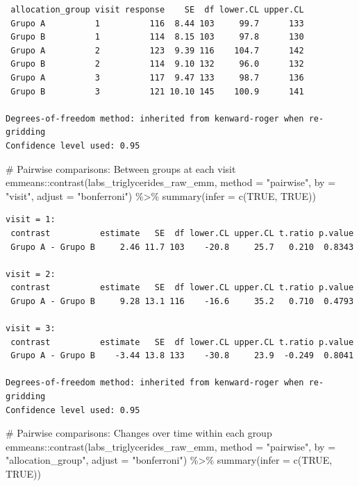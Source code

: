 \documentclass[
  letterpaper,
  DIV=11,
  numbers=noendperiod]{scrartcl}
\newenvironment{Shaded}{\begin{snugshade}}{\end{snugshade}}
\newcommand{\AttributeTok}[1]{\textcolor[rgb]{0.40,0.45,0.13}{#1}}
\newcommand{\CommentTok}[1]{\textcolor[rgb]{0.37,0.37,0.37}{#1}}
\newcommand{\ConstantTok}[1]{\textcolor[rgb]{0.56,0.35,0.01}{#1}}
\newcommand{\FunctionTok}[1]{\textcolor[rgb]{0.28,0.35,0.67}{#1}}
\newcommand{\NormalTok}[1]{\textcolor[rgb]{0.00,0.23,0.31}{#1}}
\newcommand{\SpecialCharTok}[1]{\textcolor[rgb]{0.37,0.37,0.37}{#1}}
\newcommand{\StringTok}[1]{\textcolor[rgb]{0.13,0.47,0.30}{#1}}
\begin{document}
\begin{verbatim}
 allocation_group visit response    SE  df lower.CL upper.CL
 Grupo A          1          116  8.44 103     99.7      133
 Grupo B          1          114  8.15 103     97.8      130
 Grupo A          2          123  9.39 116    104.7      142
 Grupo B          2          114  9.10 132     96.0      132
 Grupo A          3          117  9.47 133     98.7      136
 Grupo B          3          121 10.10 145    100.9      141

Degrees-of-freedom method: inherited from kenward-roger when re-gridding 
Confidence level used: 0.95 
\end{verbatim}

\begin{Shaded}
\begin{Highlighting}[]
\CommentTok{\# Pairwise comparisons: Between groups at each visit}
\NormalTok{emmeans}\SpecialCharTok{::}\FunctionTok{contrast}\NormalTok{(labs\_triglycerides\_raw\_emm, }\AttributeTok{method =} \StringTok{"pairwise"}\NormalTok{, }\AttributeTok{by =} \StringTok{"visit"}\NormalTok{, }\AttributeTok{adjust =} \StringTok{"bonferroni"}\NormalTok{) }\SpecialCharTok{\%\textgreater{}\%} \FunctionTok{summary}\NormalTok{(}\AttributeTok{infer =} \FunctionTok{c}\NormalTok{(}\ConstantTok{TRUE}\NormalTok{, }\ConstantTok{TRUE}\NormalTok{))}
\end{Highlighting}
\end{Shaded}

\begin{verbatim}
visit = 1:
 contrast          estimate   SE  df lower.CL upper.CL t.ratio p.value
 Grupo A - Grupo B     2.46 11.7 103    -20.8     25.7   0.210  0.8343

visit = 2:
 contrast          estimate   SE  df lower.CL upper.CL t.ratio p.value
 Grupo A - Grupo B     9.28 13.1 116    -16.6     35.2   0.710  0.4793

visit = 3:
 contrast          estimate   SE  df lower.CL upper.CL t.ratio p.value
 Grupo A - Grupo B    -3.44 13.8 133    -30.8     23.9  -0.249  0.8041

Degrees-of-freedom method: inherited from kenward-roger when re-gridding 
Confidence level used: 0.95 
\end{verbatim}

\begin{Shaded}
\begin{Highlighting}[]
\CommentTok{\# Pairwise comparisons: Changes over time within each group}
\NormalTok{emmeans}\SpecialCharTok{::}\FunctionTok{contrast}\NormalTok{(labs\_triglycerides\_raw\_emm, }\AttributeTok{method =} \StringTok{"pairwise"}\NormalTok{, }\AttributeTok{by =} \StringTok{"allocation\_group"}\NormalTok{, }\AttributeTok{adjust =} \StringTok{"bonferroni"}\NormalTok{) }\SpecialCharTok{\%\textgreater{}\%} \FunctionTok{summary}\NormalTok{(}\AttributeTok{infer =} \FunctionTok{c}\NormalTok{(}\ConstantTok{TRUE}\NormalTok{, }\ConstantTok{TRUE}\NormalTok{))}
\end{Highlighting}
\end{Shaded}
\end{document}
